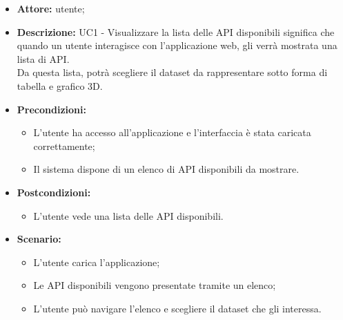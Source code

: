\begin{itemize}
    \item \textbf{Attore:} utente;
    \item \textbf{Descrizione:} UC1 - Visualizzare la lista delle API disponibili significa che quando un utente interagisce con l'applicazione web,
    gli verrà mostrata una lista di API.\\ Da questa lista, potrà scegliere il dataset da rappresentare sotto forma di tabella e grafico 3D.
    \item \textbf{Precondizioni:}
    \begin{itemize}
        \item L'utente ha accesso all'applicazione e l'interfaccia è stata caricata correttamente;
        \item Il sistema dispone di un elenco di API disponibili da mostrare.
    \end{itemize}
    \item \textbf{Postcondizioni:}
    \begin{itemize}
        \item L'utente vede una lista delle API disponibili.
    \end{itemize}
    \item \textbf{Scenario:} 
    \begin{itemize}
        \item L'utente carica l'applicazione;
        \item Le API disponibili vengono presentate tramite un elenco;
        \item L'utente può navigare l'elenco e scegliere il dataset che gli interessa.
    \end{itemize}
\end{itemize}
\newpage
